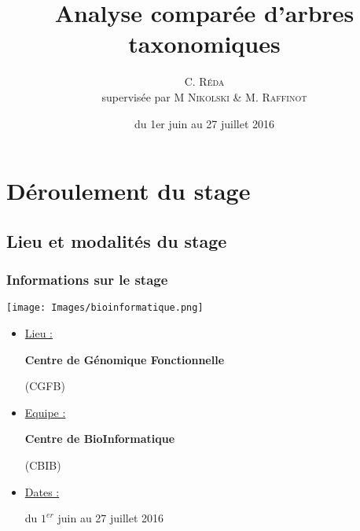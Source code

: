 \documentclass{beamer}
\title{Analyse comparée d'arbres taxonomiques}
\author{C. \textsc{Réda}\\supervisée par M \textsc{Nikolski} \& M. \textsc{Raffinot}}
\institute{CGFB, équipe CBIB, Bordeaux}
\date{du 1er juin au 27 juillet 2016}
\begin{document}
\maketitle
\tableofcontents
\setlength{\parindent}{1cm}


\section{Déroulement du stage}

\begin{frame}
\tableofcontents[currentsection]
\end{frame}

\subsection{Lieu et modalités du stage}

\begin{frame}
\tableofcontents[currentsubsection]
\end{frame}

\begin{frame}
\frametitle{Informations sur le stage}

\begin{center}

\texttt{[image: Images/bioinformatique.png]}

\begin{itemize}
\item \uline{Lieu :} 
\begin{flushcenter} \bf Centre de Génomique Fonctionnelle \end{flushcenter}
\bigskip
\begin{flushcenter} (CGFB) \end{flushcenter}
\item \uline{Equipe :} 
\begin{flushcenter} \bf Centre de BioInformatique \end{flushcenter}
\bigskip
\begin{flushcenter} (CBIB) \end{flushcenter}
\item \uline{Dates :} 
\begin{flushcenter} du $1^{er}$ juin au 27 juillet 2016 \end{flushcenter}
\end{itemize}

\end{center}


\end{frame}
\end{document}
